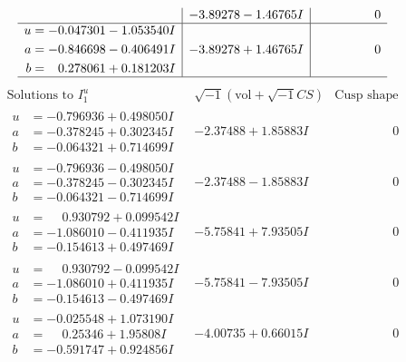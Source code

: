 \documentclass[1p]{elsarticle_modified}
\theoremstyle{definition}
\newcommand{\I}{\sqrt{-1}}
\begin{document}
$$\begin{array}{c|c|c}
 & -3.89278 - 1.46765 I & \phantom{-0.000000 } 0 \\ \hline\begin{aligned}
u &= -0.047301 - 1.053540 I \\
a &= -0.846698 - 0.406491 I \\
b &= \phantom{-}0.278061 + 0.181203 I\end{aligned}
 & -3.89278 + 1.46765 I & \phantom{-0.000000 } 0\\
 \hline 
 \end{array}$$\newpage$$\begin{array}{c|c|c}  
\text{Solutions to }I^u_{1}& \I (\text{vol} + \sqrt{-1}CS) & \text{Cusp shape}\\
 \hline 
\begin{aligned}
u &= -0.796936 + 0.498050 I \\
a &= -0.378245 + 0.302345 I \\
b &= -0.064321 + 0.714699 I\end{aligned}
 & -2.37488 + 1.85883 I & \phantom{-0.000000 } 0 \\ \hline\begin{aligned}
u &= -0.796936 - 0.498050 I \\
a &= -0.378245 - 0.302345 I \\
b &= -0.064321 - 0.714699 I\end{aligned}
 & -2.37488 - 1.85883 I & \phantom{-0.000000 } 0 \\ \hline\begin{aligned}
u &= \phantom{-}0.930792 + 0.099542 I \\
a &= -1.086010 - 0.411935 I \\
b &= -0.154613 + 0.497469 I\end{aligned}
 & -5.75841 + 7.93505 I & \phantom{-0.000000 } 0 \\ \hline\begin{aligned}
u &= \phantom{-}0.930792 - 0.099542 I \\
a &= -1.086010 + 0.411935 I \\
b &= -0.154613 - 0.497469 I\end{aligned}
 & -5.75841 - 7.93505 I & \phantom{-0.000000 } 0 \\ \hline\begin{aligned}
u &= -0.025548 + 1.073190 I \\
a &= \phantom{-}0.25346 + 1.95808 I \\
b &= -0.591747 + 0.924856 I\end{aligned}
 & -4.00735 + 0.66015 I & \phantom{-0.000000 } 0 \\ \hline\begin{aligned}

\end{aligned}
\end{array}$$
\end{document}
